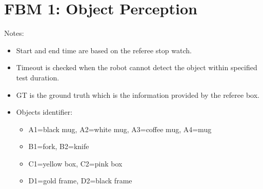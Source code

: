 \section*{FBM 1: Object Perception}


\noindent Notes:
\begin{itemize}
\item Start and end time are based on the referee stop watch.
\item Timeout is checked when the robot cannot detect the object within specified test duration.
\item GT is the ground truth which is the information provided by the referee box.
\item Objects identifier:
	\begin{itemize}
		\item A1=black mug, A2=white mug, A3=coffee mug, A4=mug
		\item B1=fork, B2=knife
		\item C1=yellow box, C2=pink box
		\item D1=gold frame, D2=black frame
	\end{itemize}
\end{itemize}

\vspace{0.5cm}


\newpage
{}\\
\\
\\

\newpage
{}\\
\\
\\

\newpage
{}\\
\\



